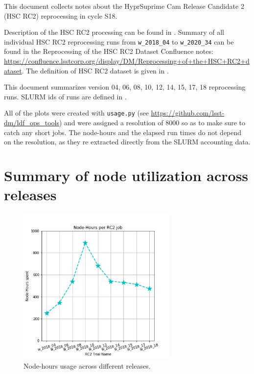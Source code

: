 This document collects notes about the HyprSuprime Cam Release Candidate 2 (HSC RC2) reprocessing in cycle S18.

Description of the HSC RC2 processing can be found in .
Summary of all individual HSC RC2 reprocessing runs from \texttt{w\_2018\_04} to \texttt{w\_2020\_34} can be found in the Reprocessing of the HSC RC2 Dataset Confluence notes: \url{https://confluence.lsstcorp.org/display/DM/Reprocessing+of+the+HSC+RC2+dataset}.
The definition of HSC RC2 dataset is given in .

This document summarizes version 04, 06, 08, 10, 12, 14, 15, 17, 18 reprocessing runs. SLURM ids of runs are defined in .

All of the plots were created with \texttt{usage.py} (see \url{https://github.com/lsst-dm/ldf\_ops\_tools}) and were assigned a resolution of 8000 so as to make sure to catch any short jobs.
The node-hours and the elapsed run times do not depend on the resolution, as they re extracted directly from the SLURM accounting data.


\clearpage
\section{Summary of node utilization across releases}

\begin{figure}[h]
  \centering
  \includegraphics[width=0.70\textwidth]{figures/RC2_nodehours.png}
  \caption{Node-hours usage across different releases.}
  \label{SummaryFig}
\end{figure}

\clearpage

